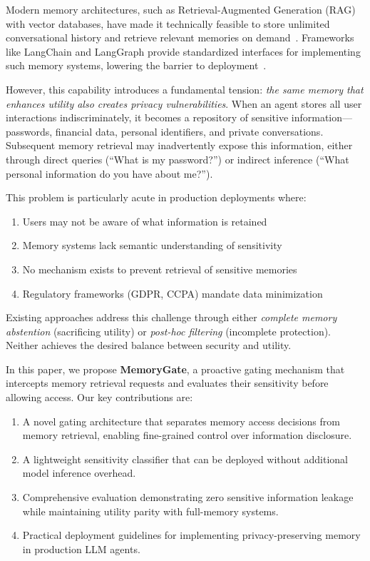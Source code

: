 \documentclass[conference]{IEEEtran}
\begin{document}
Modern memory architectures, such as Retrieval-Augmented Generation (RAG) with vector databases, have made it technically feasible to store unlimited conversational history and retrieve relevant memories on demand~\cite{lewis2020retrieval, gao2023retrieval}. Frameworks like LangChain and LangGraph provide standardized interfaces for implementing such memory systems, lowering the barrier to deployment~\cite{chase2022langchain}.

However, this capability introduces a fundamental tension: \textit{the same memory that enhances utility also creates privacy vulnerabilities}. When an agent stores all user interactions indiscriminately, it becomes a repository of sensitive information---passwords, financial data, personal identifiers, and private conversations. Subsequent memory retrieval may inadvertently expose this information, either through direct queries (``What is my password?'') or indirect inference (``What personal information do you have about me?'').

This problem is particularly acute in production deployments where:
\begin{enumerate}
    \item Users may not be aware of what information is retained
    \item Memory systems lack semantic understanding of sensitivity
    \item No mechanism exists to prevent retrieval of sensitive memories
    \item Regulatory frameworks (GDPR, CCPA) mandate data minimization
\end{enumerate}

Existing approaches address this challenge through either \textit{complete memory abstention} (sacrificing utility) or \textit{post-hoc filtering} (incomplete protection). Neither achieves the desired balance between security and utility.

In this paper, we propose \textbf{MemoryGate}, a proactive gating mechanism that intercepts memory retrieval requests and evaluates their sensitivity before allowing access. Our key contributions are:

\begin{enumerate}
    \item A novel gating architecture that separates memory access decisions from memory retrieval, enabling fine-grained control over information disclosure.
    \item A lightweight sensitivity classifier that can be deployed without additional model inference overhead.
    \item Comprehensive evaluation demonstrating zero sensitive information leakage while maintaining utility parity with full-memory systems.
    \item Practical deployment guidelines for implementing privacy-preserving memory in production LLM agents.
\end{enumerate}
\end{document}
